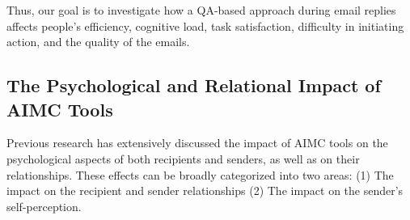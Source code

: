 Thus, our goal is to investigate how a QA-based approach during email replies affects people's efficiency, cognitive load, task satisfaction, difficulty in initiating action, and the quality of the emails.





\subsection{The Psychological and Relational Impact of AIMC Tools}
Previous research has extensively discussed the impact of AIMC tools on the psychological aspects of both recipients and senders, as well as on their relationships. 
These effects can be broadly categorized into two areas:
(1) The impact on the recipient and sender relationships
(2) The impact on the sender’s self-perception.

